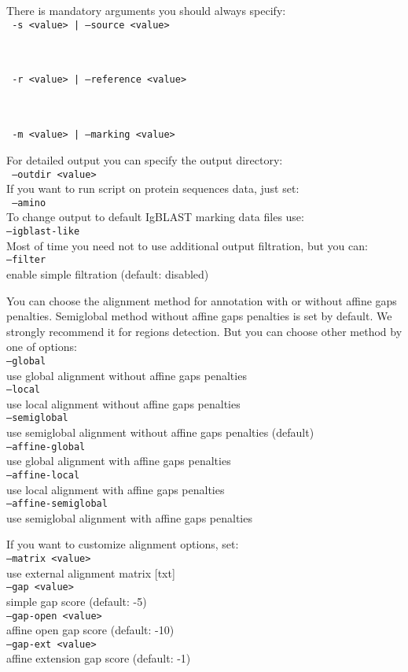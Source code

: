 \documentclass{scrartcl}
\newcommand{\shellcmd}[1]{\\\indent\indent\texttt{\footnotesize #1}\\}
\begin{document}
There is mandatory arguments you should always specify:
{\shellcmd{ -s <value> | --source <value>}}
\indent{}\\
{\shellcmd{ -r <value> | --reference <value>}
\indent{}\\
{\shellcmd{ -m <value> | --marking <value>}
\indent{}


For detailed output you can specify the output directory:
  \shellcmd{ --outdir <value>}


If you want to run script on protein sequences data, just set:
  \shellcmd{ --amino}


To change output to default IgBLAST marking data files use:
	\shellcmd{--igblast-like}


Most of time you need not to use additional output filtration, but you can:
	\shellcmd{--filter}
        enable simple filtration (default: disabled)


You can choose the alignment method for annotation with or without affine gaps penalties.
Semiglobal method without affine gaps penalties is set by default.
We strongly recommend it for regions detection.
But you can choose other method by one of options: 
    \shellcmd{--global}
        use global alignment without affine gaps penalties
    \shellcmd{--local}
        use local alignment without affine gaps penalties
    \shellcmd{--semiglobal}
        use semiglobal alignment without affine gaps penalties (default)
  \shellcmd{--affine-global}
        use global alignment with affine gaps penalties
  \shellcmd{--affine-local}
        use local alignment with affine gaps penalties
  \shellcmd{--affine-semiglobal}
        use semiglobal alignment with affine gaps penalties


If you want to customize alignment options, set:
  \shellcmd{--matrix <value>}
        use external alignment matrix [txt]
  \shellcmd{--gap <value>}
        simple gap score (default: -5)
  \shellcmd{--gap-open <value>}
        affine open gap score (default: -10)
  \shellcmd{--gap-ext <value>}
        affine extension gap score (default: -1)


}}
\end{document}
